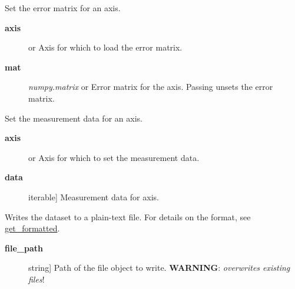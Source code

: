 \documentclass[a4paper,10pt,english]{sphinxmanual}
\begin{document}
\begin{fulllineitems}
\begin{fulllineitems}
\end{fulllineitems}


\begin{fulllineitems}
\label{index:kafe.dataset.Dataset.set_cov_mat}
Set the error matrix for an axis.
\begin{description}
\item[{\textbf{axis}}] \leavevmode{[} or \code{'y'}{]}
Axis for which to load the error matrix.

\item[{\textbf{mat}}] \leavevmode{[}\emph{numpy.matrix} or \code{None}{]}
Error matrix for the axis. Passing  unsets the error
matrix.

\end{description}

\end{fulllineitems}


\begin{fulllineitems}
\label{index:kafe.dataset.Dataset.set_data}
Set the measurement data for an axis.
\begin{description}
\item[{\textbf{axis}}] \leavevmode{[} or \code{'y'}{]}
Axis for which to set the measurement data.

\item[{\textbf{data}}] \leavevmode{[}iterable{]}
Measurement data for axis.

\end{description}

\end{fulllineitems}


\begin{fulllineitems}
\label{index:kafe.dataset.Dataset.write_formatted}
Writes the dataset to a plain-text file. For details on the format, see
{\hyperref[index:get-formatted]{get\_formatted}}.
\begin{description}
\item[{\textbf{file\_path}}] \leavevmode{[}string{]}
Path of the file object to write. \textbf{WARNING}: \emph{overwrites existing
files}!


\end{description}
\end{fulllineitems}
\end{fulllineitems}
\end{document}
